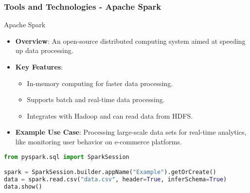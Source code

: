 \documentclass[aspectratio=169]{beamer}
\begin{document}
\begin{frame}[fragile]
    \frametitle{Tools and Technologies - Apache Spark}
    \begin{block}{Apache Spark}
        \begin{itemize}
            \item \textbf{Overview}: An open-source distributed computing system aimed at speeding up data processing.
            \item \textbf{Key Features}:
            \begin{itemize}
                \item In-memory computing for faster data processing.
                \item Supports batch and real-time data processing.
                \item Integrates with Hadoop and can read data from HDFS.
            \end{itemize}
            \item \textbf{Example Use Case}: Processing large-scale data sets for real-time analytics, like monitoring user behavior on e-commerce platforms.
        \end{itemize}
    \end{block}
    \begin{lstlisting}[language=Python, basicstyle=\tiny]
from pyspark.sql import SparkSession

spark = SparkSession.builder.appName("Example").getOrCreate()
data = spark.read.csv("data.csv", header=True, inferSchema=True)
data.show()
    \end{lstlisting}
\end{frame}
\end{document}
